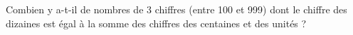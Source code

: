  Combien y a-t-il de nombres de 3 chiffres (entre 100 et 999) dont le
 chiffre des dizaines est égal à la somme des chiffres des centaines
 et des unités ?